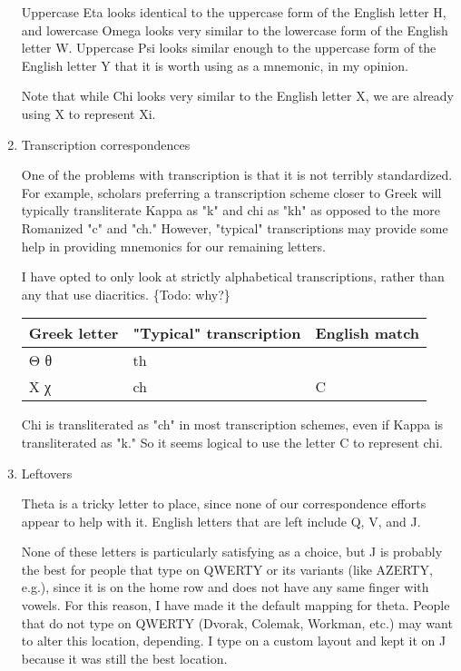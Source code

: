 \documentclass[11pt]{article}
\begin{document}
\begin{enumerate}
Uppercase Eta looks identical to the uppercase form of the English letter H, and lowercase Omega looks very similar to the lowercase form of the English letter W. Uppercase Psi looks similar enough to the uppercase form of the English letter Y that it is worth using as a mnemonic, in my opinion.

Note that while Chi looks very similar to the English letter X, we are already using X to represent Xi.

\item Transcription correspondences
\label{sec:org6f7e29b}

One of the problems with transcription is that it is not terribly standardized. For example, scholars preferring a transcription scheme closer to Greek will typically transliterate Kappa as "k" and chi as "kh" as opposed to the more Romanized "c" and "ch." However, "typical" transcriptions may provide some help in providing mnemonics for our remaining letters.

I have opted to only look at strictly alphabetical transcriptions, rather than any that use diacritics. \{Todo: why?\}

\begin{center}
\begin{tabular}{lll}
Greek letter & "Typical" transcription & English match\\
\hline
Θ θ & th & \\
Χ χ & ch & C\\
\end{tabular}
\end{center}

Chi is transliterated as "ch" in most transcription schemes, even if Kappa is transliterated as "k." So it seems logical to use the letter C to represent chi.

\item Leftovers
\label{sec:org9ef71fd}

Theta is a tricky letter to place, since none of our correspondence efforts appear to help with it. English letters that are left include Q, V, and J.

None of these letters is particularly satisfying as a choice, but J is probably the best for people that type on QWERTY or its variants (like AZERTY, e.g.), since it is on the home row and does not have any same finger with vowels. For this reason, I have made it the default mapping for theta. People that do not type on QWERTY (Dvorak, Colemak, Workman, etc.) may want to alter this location, depending. I type on a custom layout and kept it on J because it was still the best location.


\end{enumerate}
\end{document}
